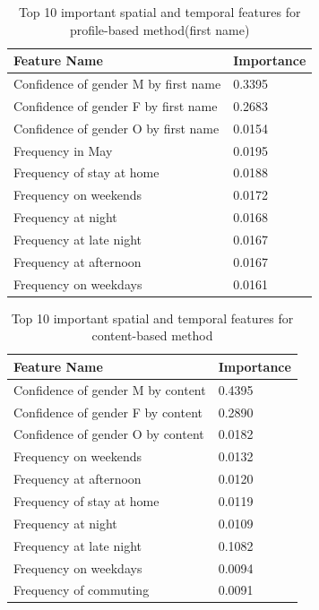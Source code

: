 \documentclass{article}
\begin{document}
\begin{table}[tp]
\centering
\caption{Top 10 important spatial and temporal features for profile-based method(first name) }
\label{tab4}
\begin{center}
\begin{small}
\begin{sc}
\begin{tabular}{ll}
Feature Name & Importance \\ \hline
Confidence of gender M by first name & 0.3395		\\
Confidence of gender F by first name&  0.2683		\\
Confidence of gender O by first name&  0.0154 	\\
Frequency in May & 0.0195		\\
Frequency of stay at home & 0.0188 \\
Frequency on weekends & 0.0172		\\
Frequency at night &  0.0168		\\
Frequency at late night & 0.0167\\		
Frequency at afternoon & 0.0167	\\	
Frequency on weekdays & 0.0161		
\end{tabular}
\end{sc}
\end{small}
\end{center}
\end{table}


\begin{table}[tp]
\centering
\caption{Top 10 important spatial and temporal features for content-based method}
\label{tab5}
\begin{center}
\begin{small}
\begin{sc}
\begin{tabular}{ll}
Feature Name & Importance \\ \hline
Confidence of gender M by content & 0.4395 \\
Confidence of gender F by content & 0.2890 \\
Confidence of gender O by content & 0.0182 \\
Frequency on weekends& 0.0132 \\
Frequency at afternoon& 0.0120 \\
Frequency of stay at home&0.0119 \\
Frequency at night& 0.0109 \\
Frequency at late night&0.1082 \\
Frequency on weekdays&0.0094 \\
Frequency of commuting&0.0091 \\
\end{tabular}
\end{sc}
\end{small}
\end{center}
\end{table}
\end{document}
